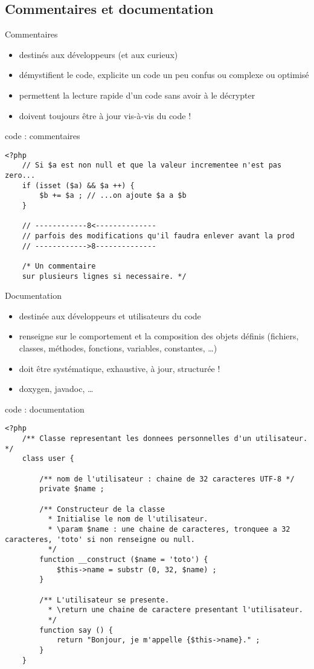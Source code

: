 \subsection{Commentaires et documentation}

\begin{frame}[containsverbatim]{Commentaires}
\begin{itemize}
\item destinés aux développeurs (et aux curieux)
\item démystifient le code, explicite un code un peu confus ou complexe ou optimisé
\item permettent la lecture rapide d'un code sans avoir à le décrypter
\item doivent toujours être à jour vis-à-vis du code ! 
\end{itemize}
\begin{block}{code : commentaires}
\begin{lstlisting}
<?php
	// Si $a est non null et que la valeur incrementee n'est pas zero...
	if (isset ($a) && $a ++) {
		$b += $a ; // ...on ajoute $a a $b
	}
	
	// ------------8<--------------
	// parfois des modifications qu'il faudra enlever avant la prod
	// ------------>8--------------	
	
	/* Un commentaire
	sur plusieurs lignes si necessaire. */
\end{lstlisting}
\end{block}
\end{frame}

\begin{frame}[containsverbatim]{Documentation}
\begin{itemize}
\item destinée aux développeurs et utilisateurs du code
\item renseigne sur le comportement et la composition des objets définis (fichiers, classes, méthodes, fonctions, variables, constantes, \ldots)
\item doit être systématique, exhaustive, à jour, structurée !
\item doxygen, javadoc, \ldots
\end{itemize}
\begin{block}{code : documentation}
\begin{lstlisting}
<?php
	/** Classe representant les donnees personnelles d'un utilisateur. */
	class user {
	
		/** nom de l'utilisateur : chaine de 32 caracteres UTF-8 */
		private $name ;
		
		/** Constructeur de la classe
		  * Initialise le nom de l'utilisateur.
		  * \param $name : une chaine de caracteres, tronquee a 32 caracteres, 'toto' si non renseigne ou null.
		  */
		function __construct ($name = 'toto') {
			$this->name = substr (0, 32, $name) ;
		}
		
		/** L'utilisateur se presente.
		  * \return une chaine de caractere presentant l'utilisateur.
		  */
		function say () {
			return "Bonjour, je m'appelle {$this->name}." ;
		}
	}
\end{lstlisting}
\end{block}
\end{frame}

